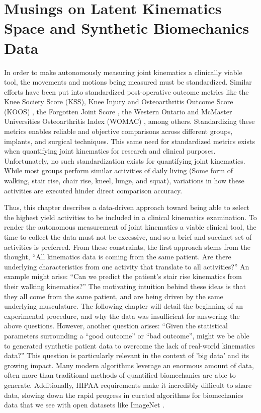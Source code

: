 \chapter{Musings on Latent Kinematics Space and Synthetic Biomechanics Data}

In order to make autonomously measuring joint kinematics a clinically viable tool, the movements and motions being measured must be standardized.
Similar efforts have been put into standardized post-operative outcome metrics like the Knee Society Score (KSS)\cite{insallRationaleKneeSociety1989}, Knee Injury and Osteoarthritis Outcome Score (KOOS) \cite{roosKneeInjuryOsteoarthritis2003}, the Forgotten Joint Score \cite{behrendForgottenJointUltimate2012}, the Western Ontario and McMaster Universities Osteoarthritis Index (WOMAC) \cite{bellamy1988validation}, among others.
Standardizing these metrics enables reliable and objective comparisons across different groups, implants, and surgical techniques.
This same need for standardized metrics exists when quantifying joint kinematics for research and clinical purposes.
Unfortunately, no such standardization exists for quantifying joint kinematics.
While most groups perform similar activities of daily living (Some form of walking, stair rise, chair rise, kneel, lunge, and squat), variations in how these activities are executed hinder direct comparison accuracy.

Thus, this chapter describes a data-driven approach toward being able to select the highest yield activities to be included in a clinical kinematics examination.
To render the autonomous measurement of joint kinematics a viable clinical tool, the time to collect the data must not be excessive, and so a brief and succinct set of activities is preferred.
From these constraints, the first approach stems from the thought, ``All kinematics data is coming from the same patient. Are there underlying characteristics from one activity that translate to all activities?''
An example might arise: ``Can we predict the patient's stair rise kinematics from their walking kinematics?''
The motivating intuition behind these ideas is that they all come from the same patient, and are being driven by the same underlying musculature.
The following chapter will detail the beginning of an experimental procedure, and why the data was insufficient for answering the above questions.
However, another question arises: ``Given the statistical parameters surrounding a ``good outcome'' or ``bad outcome'', might we be able to generated synthetic patient data to overcome the lack of real-world kinematics data?''
This question is particularly relevant in the context of 'big data' and its growing impact.
Many modern algorithms leverage an enormous amount of data, often more than traditional methods of quantified biomechanics are able to generate.
Additionally, HIPAA requirements make it incredibly difficult to share data, slowing down the rapid progress in curated algorithms for biomechanics data that we see with open datasets like ImageNet \cite{russakovskyImageNetLargeScale2015}.

